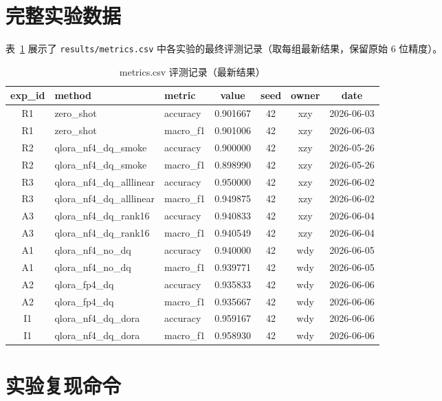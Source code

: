 \documentclass[12pt,a4paper]{article}
\begin{document}
\section{完整实验数据}

表~\ref{tab:full_metrics} 展示了 \texttt{results/metrics.csv} 中各实验的最终评测记录（取每组最新结果，保留原始 6 位精度）。

\begin{table}[H]
\centering
\caption{metrics.csv 评测记录（最新结果）}
\label{tab:full_metrics}
\small
\begin{tabular}{cllcccc}
\toprule
\textbf{exp\_id} & \textbf{method} & \textbf{metric} & \textbf{value} & \textbf{seed} & \textbf{owner} & \textbf{date} \\
\midrule
R1 & zero\_shot & accuracy & 0.901667 & 42 & xzy & 2026-06-03 \\
R1 & zero\_shot & macro\_f1 & 0.901006 & 42 & xzy & 2026-06-03 \\
R2 & qlora\_nf4\_dq\_smoke & accuracy & 0.900000 & 42 & xzy & 2026-05-26 \\
R2 & qlora\_nf4\_dq\_smoke & macro\_f1 & 0.898990 & 42 & xzy & 2026-05-26 \\
R3 & qlora\_nf4\_dq\_alllinear & accuracy & 0.950000 & 42 & xzy & 2026-06-02 \\
R3 & qlora\_nf4\_dq\_alllinear & macro\_f1 & 0.949875 & 42 & xzy & 2026-06-02 \\
A3 & qlora\_nf4\_dq\_rank16 & accuracy & 0.940833 & 42 & xzy & 2026-06-04 \\
A3 & qlora\_nf4\_dq\_rank16 & macro\_f1 & 0.940549 & 42 & xzy & 2026-06-04 \\
A1 & qlora\_nf4\_no\_dq & accuracy & 0.940000 & 42 & wdy & 2026-06-05 \\
A1 & qlora\_nf4\_no\_dq & macro\_f1 & 0.939771 & 42 & wdy & 2026-06-05 \\
A2 & qlora\_fp4\_dq & accuracy & 0.935833 & 42 & wdy & 2026-06-06 \\
A2 & qlora\_fp4\_dq & macro\_f1 & 0.935667 & 42 & wdy & 2026-06-06 \\
I1 & qlora\_nf4\_dq\_dora & accuracy & 0.959167 & 42 & wdy & 2026-06-06 \\
I1 & qlora\_nf4\_dq\_dora & macro\_f1 & 0.958930 & 42 & wdy & 2026-06-06 \\
\bottomrule
\end{tabular}
\end{table}

\section{实验复现命令}
\end{document}
